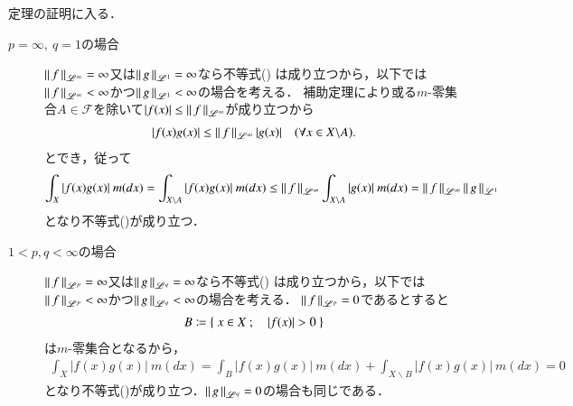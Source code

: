 \begin{prf}	
	定理の証明に入る．
	\begin{description}
		\item[$p = \infty,\ q = 1$の場合]
			$\left\|\, f\, \right\|_{\mathscr{L}^\infty} = \infty$又は$\left\|\, g\, \right\|_{\mathscr{L}^1} = \infty$なら不等式()
			は成り立つから，以下では$\left\|\, f\, \right\|_{\mathscr{L}^\infty} < \infty$かつ$\left\|\, g\, \right\|_{\mathscr{L}^1} < \infty$の場合を考える．
			補助定理により或る$m$-零集合$A \in \mathcal{F}$を除いて$|f(x)| \leq \left\|\, f\, \right\|_{\mathscr{L}^\infty}$が成り立つから
			\begin{align}
				|f(x)g(x)| \leq \left\|\, f\, \right\|_{\mathscr{L}^\infty}|g(x)| \quad (\forall x \in X \backslash A).
			\end{align}
			とでき，従って
			\begin{align}
				\int_{X} |f(x)g(x)|\ m(dx) = \int_{X \backslash A} |f(x)g(x)|\ m(dx) \leq \left\|\, f\, \right\|_{\mathscr{L}^\infty} \int_{X \backslash A} |g(x)|\ m(dx) 
				= \left\|\, f\, \right\|_{\mathscr{L}^\infty} \left\|\, g\, \right\|_{\mathscr{L}^1}
			\end{align}
			となり不等式()が成り立つ．
		
		\item[$1 < p,q < \infty$の場合]
			$\left\|\, f\, \right\|_{\mathscr{L}^p} = \infty$又は$\left\|\, g\, \right\|_{\mathscr{L}^q} = \infty$なら不等式()
			は成り立つから，以下では$\left\|\, f\, \right\|_{\mathscr{L}^p} < \infty$かつ$\left\|\, g\, \right\|_{\mathscr{L}^q} < \infty$の場合を考える．
			$\left\|\, f\, \right\|_{\mathscr{L}^p} = 0$であるとすると
			\begin{align}
				B \coloneqq \left\{\ x \in X\ ;\quad |f(x)| > 0\ \right\}
			\end{align}
			は$m$-零集合となるから，
			\begin{align}
				\int_{X} |f(x)g(x)|\ m(dx) = \int_{B} |f(x)g(x)|\ m(dx) + \int_{X \backslash B} |f(x)g(x)|\ m(dx) = 0
			\end{align}
			となり不等式()が成り立つ．$\left\|\, g\, \right\|_{\mathscr{L}^q} = 0$の場合も同じである．
			

\end{description}
\end{prf}
